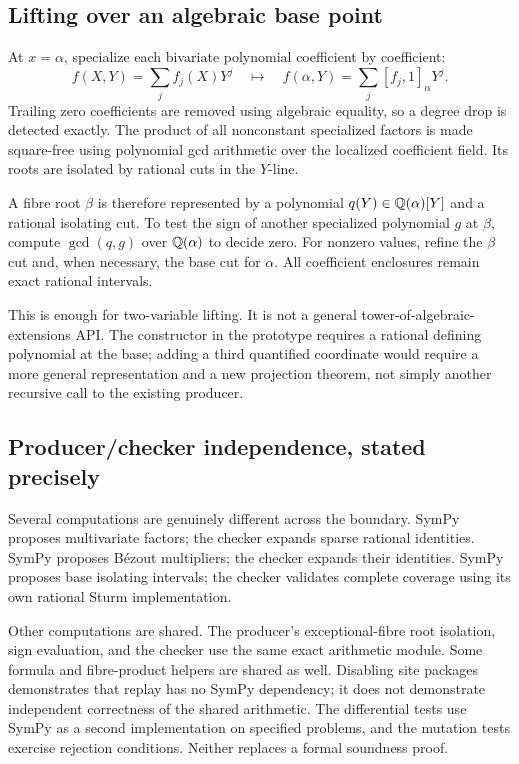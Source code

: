 \subsection{Lifting over an algebraic base point}
At $x=\alpha$, specialize each bivariate polynomial coefficient by coefficient:
\[
 f(X,Y)=\sum_j f_j(X)Y^j
 \quad\longmapsto\quad
 f(\alpha,Y)=\sum_j[f_j,1]_\alpha Y^j.
\]
Trailing zero coefficients are removed using algebraic equality, so a degree drop is detected exactly. The product of all nonconstant specialized factors is made square-free using polynomial gcd arithmetic over the localized coefficient field. Its roots are isolated by rational cuts in the $Y$-line.

A fibre root $\beta$ is therefore represented by a polynomial $q(Y)\in\mathbb Q(\alpha)[Y]$ and a rational isolating cut. To test the sign of another specialized polynomial $g$ at $\beta$, compute $\gcd(q,g)$ over $\mathbb Q(\alpha)$ to decide zero. For nonzero values, refine the $\beta$ cut and, when necessary, the base cut for $\alpha$. All coefficient enclosures remain exact rational intervals.

This is enough for two-variable lifting. It is not a general tower-of-algebraic-extensions API. The  constructor in the prototype requires a rational defining polynomial at the base; adding a third quantified coordinate would require a more general representation and a new projection theorem, not simply another recursive call to the existing producer.

\subsection{Producer/checker independence, stated precisely}
Several computations are genuinely different across the boundary. SymPy proposes multivariate factors; the checker expands sparse rational identities. SymPy proposes B\'ezout multipliers; the checker expands their identities. SymPy proposes base isolating intervals; the checker validates complete coverage using its own rational Sturm implementation.

Other computations are shared. The producer's exceptional-fibre root isolation, sign evaluation, and the checker use the same exact arithmetic module. Some formula and fibre-product helpers are shared as well. Disabling site packages demonstrates that replay has no SymPy dependency; it does not demonstrate independent correctness of the shared arithmetic. The differential tests use SymPy as a second implementation on specified problems, and the mutation tests exercise rejection conditions. Neither replaces a formal soundness proof.

